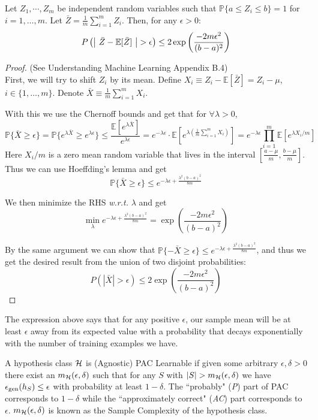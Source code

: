 \documentclass{article}
\begin{document}
\begin{thm}
Let $Z_1, \cdots, Z_m$ be independent random variables such that $\mathbb{P}\{a \leq Z_i \leq b\} = 1$ for $i = 1, \ldots, m$. Let $\bar{Z} = \frac{1}{m}\sum_{i=1}^m Z_i$. Then, for any $\epsilon > 0$:
\[
	P\left( \left| \ \bar{Z} - \E[\bar{Z}] \ \right| > \epsilon\right) \le 2 \exp\left(\frac{-2 m \epsilon^2}{(b-a)^2}\right)
\]
\end{thm}
\begin{proof}
(See Understanding Machine Learning \cite{Shalev-Shwartz:2014:UML:2621980} Appendix B.4) \\
First, we will try to shift $Z_i$ by its mean. Define $X_i \equiv Z_i - \mathbb{E}[\bar{Z}] = Z_i - \mu$, $i\in\{1, \dots, m\}$. Denote $\bar{X} \equiv \frac{1}{m}\sum_{i=1}^{m}{X_i}$.

With this we use the Chernoff bounds and get that for $\forall \lambda > 0$, %
$$\mathbb{P}\{\bar{X} \geq \epsilon\} = \mathbb{P}\{e^{\lambda \bar{X}} \geq e^{\lambda \epsilon}\} \leq \frac{\mathbb{E}[e^{\lambda \bar{X}}]}{e^{\lambda \epsilon}} = e^{-\lambda \epsilon} \cdot \mathbb{E}[e^{\lambda(\frac{1}{m}\sum_{i=1}^{m}{X_i})}] = e^{-\lambda \epsilon} \prod_{i = 1}^{m}{\mathbb{E}[e^{\lambda X_i / m}]}$$
Here $X_i / m$ is a zero mean random variable that lives in the interval $[\frac{a-\mu}{m}, \frac{b-\mu}{m}]$. Thus we can use Hoeffding's lemma and get
$$\mathbb{P}\{\bar{X} \geq \epsilon\} \leq e^{-\lambda \epsilon + \frac{\lambda^2 (b-a)^2}{8m}}$$

We then minimize the RHS \textit{w.r.t.} $\lambda$ and get
$$\min_{\lambda}{e^{-\lambda \epsilon + \frac{\lambda^2 (b-a)^2}{8m}}} = \exp\left(\frac{-2m\epsilon^2}{(b-a)^2}\right)$$

By the same argument we can show that $\mathbb{P}\{-\bar{X} \geq \epsilon\} \leq e^{-\lambda \epsilon + \frac{\lambda^2 (b-a)^2}{8m}}$, and thus we get the desired result from the union of two disjoint probabilities:
\[
	P\left( | \bar{X} | > \epsilon\right) \le 2 \exp\left(\frac{-2 m \epsilon^2}{(b-a)^2}\right)
\]

\end{proof}

The expression above says that for any positive $\epsilon$, our sample mean will be at least $\epsilon$ away from its expected value with a probability that decays exponentially with the number of training examples we have.


\begin{defn}
A hypothesis class $\mathcal{H}$ is (Agnostic) PAC Learnable if given some arbitrary $\epsilon, \delta > 0$ there exist an $m_{\mathcal{H}} (\epsilon,\delta)$ such that for any $S$ with $|S| > m_{\mathcal{H}} (\epsilon,\delta)$ we have $\epsilon_{\text{gen}}(h_S) \le \epsilon$ with probability at least $1 - \delta$. The ``probably" (\emph{P}) part of PAC corresponds to $1 - \delta$ while the ``approximately correct" (\emph{AC}) part corresponds to $\epsilon$. $m_{\mathcal{H}} (\epsilon,\delta)$ is known as the Sample Complexity of the hypothesis class.
\end{defn}
\end{document}
